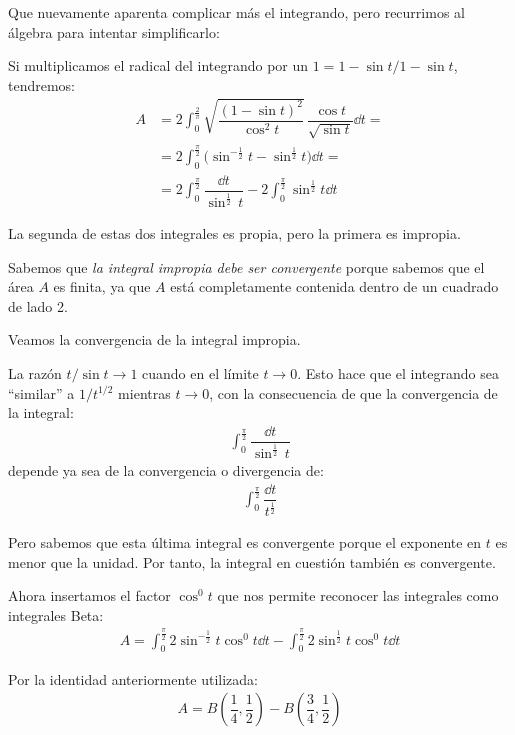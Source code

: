 Que nuevamente aparenta complicar más el integrando, pero recurrimos al álgebra para intentar simplificarlo:

Si multiplicamos el radical del integrando por un $1 = 1 - \sin t / 1 - \sin t$, tendremos:
\begin{align*}
A &= 2 \int_{0}^{\frac{2}{\pi}} \sqrt{\dfrac{(1 - \sin t)^{2}}{\cos^{2} t}} \, \dfrac{\cos t}{\sqrt{\sin t}} \dd{t} = \\[1em]
&= 2 \int_{0}^{\frac{\pi}{2}} \big( \sin^{-\frac{1}{2}} t - \sin^{\frac{1}{2}} t \big) \dd{t} = \\[1em]
&= 2 \int_{0}^{\frac{\pi}{2}} \dfrac{\dd{t}}{\sin^{\frac{1}{2}} \, t} - 2 \int_{0}^{\frac{\pi}{2}} \sin^{\frac{1}{2}} t \dd{t}
\end{align*}

La segunda de estas dos integrales es propia, pero la primera es impropia.
\par
Sabemos que \emph{la integral impropia debe ser convergente} porque sabemos que el área $A$ es finita, ya que $A$ está completamente contenida dentro de un cuadrado de lado 2.
\par
Veamos la convergencia de la integral impropia.

La razón $t/\sin t \to 1$ cuando en el límite $t \to 0$. Esto hace que el integrando sea \enquote{similar} a $1 / t^{1/2}$ mientras $t \to 0$, con la consecuencia de que la convergencia de la integral:
\begin{align*}
\int_{0}^{\frac{\pi}{2}} \dfrac{\dd{t}}{\sin^{\frac{1}{2}} \, t}
\end{align*}
depende ya sea de la convergencia o divergencia de:
\begin{align*}
\int_{0}^{\frac{\pi}{2}} \dfrac{\dd{t}}{t^{\frac{1}{2}}}
\end{align*}

Pero sabemos que esta última integral es convergente porque el exponente en $t$ es menor que la unidad. Por tanto, la integral en cuestión también es convergente.
\par
Ahora insertamos el factor $\cos^{0} t$ que nos permite reconocer las integrales como integrales Beta:
\begin{align*}
A = \int_{0}^{\frac{\pi}{2}} 2 \sin^{-\frac{1}{2}} t \cos^{0} t \dd{t} - \int_{0}^{\frac{\pi}{2}} 2 \sin^{\frac{1}{2}} t \cos^{0} t \dd{t}
\end{align*}

Por la identidad anteriormente utilizada:
\begin{align*}
A = B \left( \dfrac{1}{4}, \dfrac{1}{2} \right) - B \left( \dfrac{3}{4}, \dfrac{1}{2} \right)
\end{align*}

